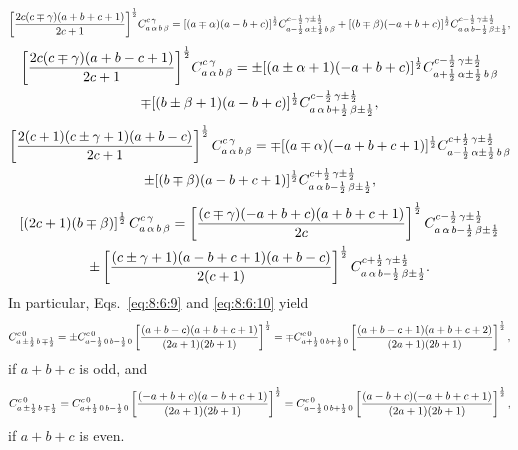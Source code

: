 \begin{multline}
{\left[\frac{2 c(c \mp \gamma)(a+b+c+1)}{2 c+1}\right]}^{\frac{1}{2}}
C_{a\,\alpha\,b\,\beta}^{c\,\gamma}
=[(a \mp \alpha)(a-b+c)]^{\frac{1}{2}} 
C_{a-\frac{1}{2}\,\alpha\pm\frac{1}{2}\,b\,\beta}^{c-\frac{1}{2}\,\gamma\pm\frac{1}{2}}+
[(b\mp\beta)(-a+b+c)]^{\frac{1}{2}} 
C_{a\,\alpha\,b-\frac{1}{2}\,\beta\pm\frac{1}{2}}^{c-\frac{1}{2}\,\gamma\pm\frac{1}{2}}, \label{eq:8:6:14}
\end{multline}
\begin{multline}
  {\left[\frac{2 c(c \mp \gamma)(a+b-c+1)}{2 c+1}\right]}^{\frac{1}{2}}
C_{a\,\alpha\,b\,\beta}^{c\,\gamma}
=\pm[(a \pm \alpha+1)(-a+b+c)]^{\frac{1}{2}} 
C_{a+\frac{1}{2}\,\alpha\pm\frac{1}{2}\,b\,\beta}^{c-\frac{1}{2}\,\gamma\pm\frac{1}{2}}\\
\mp[(b \pm \beta+1)(a-b+c)]^{\frac{1}{2}} C_{a\,\alpha\,b+\frac{1}{2}\,\beta \pm \frac{1}{2}}^{c-\frac{1}{2}\,\gamma \pm \frac{1}{2}} , \label{eq:8:6:15}
\end{multline}
\begin{multline}
{\left[\frac{2(c+1)(c \pm \gamma+1)(a+b-c)}{2 c+1}\right]^{\frac{1}{2}}C_{a\,\alpha\,b\,\beta}^{c\,\gamma}
=\mp[(a \mp \alpha)(-a+b+c+1)]^{\frac{1}{2}} C_{a-\frac{1}{2}\,\alpha \pm \frac{1}{2}\,b\,\beta}^{c+\frac{1}{2}\,\gamma \pm \frac{1}{2}}} \\
\pm[(b \mp \beta)(a-b+c+1)]^{\frac{1}{2}} C_{a\,\alpha\,b-\frac{1}{2}\,\beta \pm \frac{1}{2}}^{c+\frac{1}{2}\,\gamma \pm \frac{1}{2}}, \label{eq:8:6:16}
\end{multline}
\begin{multline}
{\left[(2c+1)(b\mp\beta)\right]^{\frac{1}{2}}C_{a\,\alpha\,b\,\beta}^{c\,\gamma}=\left[\frac{(c\mp\gamma)(-a+b+c)(a+b+c+1)}{2c}\right]^{\frac{1}{2}} C_{a\,\alpha\,b-\frac{1}{2}\,\beta \pm \frac{1}{2}}^{c-\frac{1}{2}\,\gamma \pm \frac{1}{2}}} \\
\pm\left[\frac{(c \pm \gamma+1)(a-b+c+1)(a+b-c)}{2(c+1)}\right]^{\frac{1}{2}}
C_{a\,\alpha\,b-\frac{1}{2}\,\beta \pm \frac{1}{2}}^{c+\frac{1}{2}\,\gamma\pm\frac{1}{2}}. 
\label{eq:8:6:17}
\end{multline}
In particular, Eqs.~\eqref{eq:8:6:9} and \eqref{eq:8:6:10} yield
\begin{equation}
C_{a\,\pm \frac{1}{2}\,b\,\mp \frac{1}{2}}^{c\,0}= \pm C_{a-\frac{1}{2}\,0\,b-\frac{1}{2}\,0}^{c\,0}\left[\frac{(a+b-c)(a+b+c+1)}{(2 a+1)(2 b+1)}\right]^{\frac{1}{2}}=\mp C_{a+\frac{1}{2}\,0\,b+\frac{1}{2}\,0}^{c\,0}\left[\frac{(a+b-c+1)(a+b+c+2)}{(2 a+1)(2 b+1)}\right]^{\frac{1}{2}}, \label{eq:8:6:18}
\end{equation}
if $a+b+c$ is odd, and
\begin{equation}
C_{a\,\pm \frac{1}{2}\,b\,\mp \frac{1}{2}}^{c\,0}=C_{a+\frac{1}{2}\,0\,b-\frac{1}{2}\,0}^{c\,0}\left[\frac{(-a+b+c)(a-b+c+1)}{(2 a+1)(2 b+1)}\right]^{\frac{1}{2}}=C_{a-\frac{1}{2}\,0\,b+\frac{1}{2}\,0}^{c\,0}\left[\frac{(a-b+c)(-a+b+c+1)}{(2 a+1)(2 b+1)}\right]^{\frac{1}{2}}, \label{eq:8:6:19}
\end{equation}
if $a+b+c$ is even.

